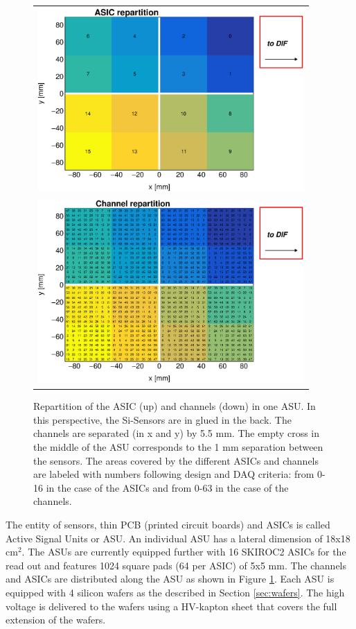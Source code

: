 \documentclass[a4paper,11pt]{article}
\begin{document}
\begin{figure}[!t]
  \centering
  \begin{tabular}{l}
    \includegraphics[width=4in]{../figs/ASU_geometry1.eps}  \\
    \includegraphics[width=4in]{../figs/ASU_geometry2.eps}  \\
  \end{tabular}
  \caption{Repartition of the ASIC (up) and channels (down) in one ASU. In this perspective, the Si-Sensors are in glued in the back.
    The channels are separated (in x and y) by 5.5 mm.
    The empty cross in the middle of the ASU corresponds to the 1 mm separation between the sensors.
    The areas covered by the different ASICs and channels
    are labeled with numbers following design and DAQ criteria: from 0-16 in the case of the ASICs and from 0-63 in the case of the channels.
  }
\label{ASU}
\end{figure}

The entity
of sensors, thin PCB (printed circuit boards) and ASICs is called Active Signal Units or ASU.
An individual ASU has a lateral dimension of 18x18 cm$^{2}$.
The ASUs are currently equipped
further with 16 SKIROC2 ASICs for the read out and features 1024 square pads (64 per ASIC) of 5x5 mm.
The channels and ASICs are distributed along the ASU as shown in Figure \ref{ASU}. Each ASU is equipped with 4 silicon wafers as the described in Section \ref{sec:wafers}.
The high voltage is delivered to the wafers using a HV-kapton sheet that covers the full extension of the wafers.
\end{document}
